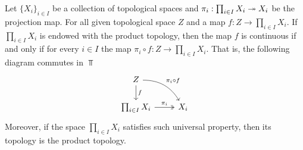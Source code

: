 \begin{theorem}
  \label{thm: prod top universal prop}
  Let \(\{X_i\}_{i \in I}\) be a collection of topological spaces and \(\pi_i:
  \prod_{i \in I} X_i \twoheadrightarrow  X_i\) be the projection map. For all given
  topological space \(Z\) and a map \(f: Z \to \prod_{i \in I} X_i\). If
  \(\prod_{i \in I} X_i\) is endowed with the product topology, then the map
  \(f\) is continuous if and only if for every \(i \in I\) the map \(\pi_i \circ
  f: Z \to \prod_{i \in I} X_i\). That is, the following diagram commutes in
  \(\Top\)
  \[
    \begin{tikzcd}
      Z \ar[d, "f"] \ar[dr, bend left, "\pi_i \circ f"] \\
      \prod_{i \in I} X_i \ar[r, two heads, "\pi_i"] &X_i
    \end{tikzcd}
  \]
  Moreover, if the space \(\prod_{i \in I} X_i\) satisfies such universal
  property, then its topology is the product topology.
\end{theorem}

